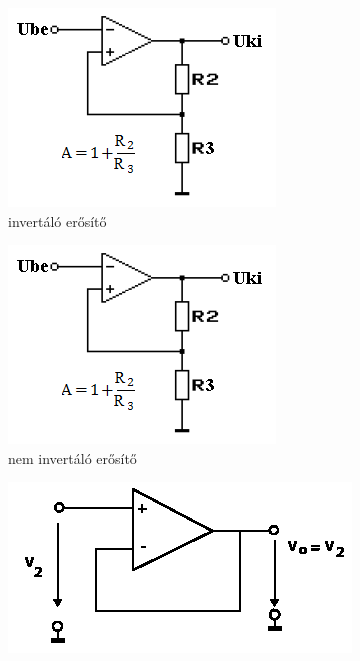 \begin{figure}[h]
	\centering
	\begin{subfigure}{0.33\linewidth}
		\includegraphics[width=\linewidth]{fig/10-op_amp_neg_invertfeedback}
		\caption{invertáló erősítő}
	\end{subfigure}
	\begin{subfigure}{0.33\linewidth}
		\includegraphics[width=\linewidth]{fig/10-op_amp_neg_noninvertfeedback}
		\caption{nem invertáló erősítő}
	\end{subfigure}
	\begin{subfigure}{0.33\linewidth}
		\includegraphics[width=\linewidth]{fig/10-op_amp_neg_voltagefollowerfeedback}

\end{subfigure}
\end{figure}
